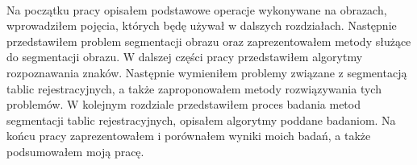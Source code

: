 \paragraph{}
Na początku pracy opisałem podstawowe operacje wykonywane na obrazach, wprowadziłem pojęcia, których będę używał w dalszych rozdziałach. Następnie przedstawiłem problem segmentacji obrazu oraz zaprezentowałem metody służące do segmentacji obrazu. W dalszej części pracy przedstawiłem algorytmy rozpoznawania znaków. Następnie wymieniłem problemy związane z segmentacją tablic rejestracyjnych, a także zaproponowałem metody rozwiązywania tych problemów. W kolejnym rozdziale przedstawiłem proces badania metod segmentacji tablic rejestracyjnych, opisałem algorytmy poddane badaniom. Na końcu pracy zaprezentowałem i porównałem wyniki moich badań, a także podsumowałem moją pracę.
